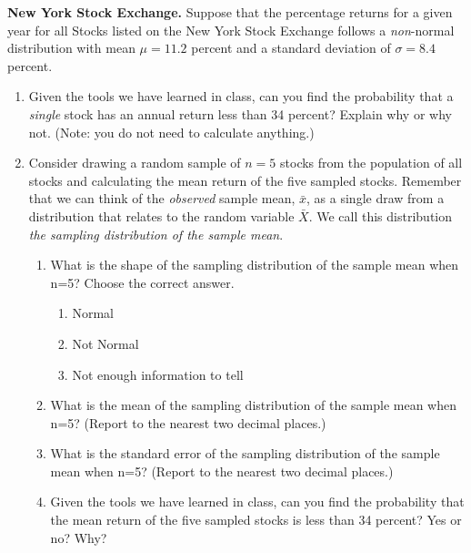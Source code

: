 \item \textbf{New York Stock Exchange.} Suppose that the percentage returns for a given year for all Stocks listed on the New York Stock Exchange follows a \emph{non}-normal distribution with mean $\mu=11.2$ percent and a standard deviation of $\sigma=8.4$ percent.

\begin{enumerate}
\item  Given the tools we have learned in class, can you find the probability that a \emph{single} stock has an annual return less than 34 percent? Explain why or why not. (Note: you do not need to calculate anything.)\\

\item Consider drawing a random sample of $n=5$ stocks from the population of all stocks and calculating the mean return of the five sampled stocks. Remember that we can think of the \emph{observed} sample mean, $\bar{x}$, as a single draw from a distribution that relates to the random variable $\bar{X}$. We call this distribution \textit{the sampling distribution of the sample mean}.
\begin{enumerate}

\item  What is the shape of the sampling distribution of the sample mean when n=5? Choose the correct answer.%
\begin{enumerate}
	\item Normal
	\item Not Normal
	\item Not enough information to tell\\
\end{enumerate}
\item What is the mean of the sampling distribution of the sample mean when n=5? (Report to the nearest two decimal places.)\\
\item What is the standard error of the sampling distribution of the sample mean when n=5? (Report to the nearest two decimal places.)\\
\item Given the tools we have learned in class, can you find the probability that the mean return of the five sampled stocks is less than 34 percent? Yes or no? Why?\\
\end{enumerate}


\end{enumerate}
